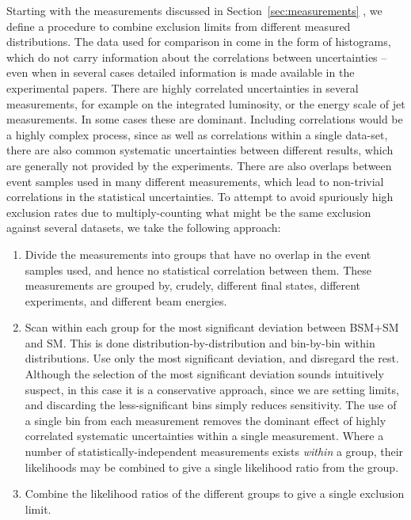 \documentclass[floatfix]{article}
\begin{document}
Starting with the measurements discussed in Section~\ref{sec:measurements} , 
we define a procedure to combine exclusion limits from different measured distributions.
The data used for comparison in \rivet come in the form of histograms, which do not carry information about the correlations between uncertainties -- 
even when in several cases detailed information is made available in the experimental papers. There are highly correlated uncertainties in several measurements, 
for example on the integrated luminosity, or the energy scale of jet measurements. In some cases these are dominant. Including correlations would be a highly 
complex process, since as well as correlations within a single data-set, there are also common systematic uncertainties between different
results, which are generally not provided by the experiments. There are also overlaps between event samples used in many different measurements, which lead to
non-trivial correlations in the statistical uncertainties. To attempt to avoid spuriously high exclusion rates due to multiply-counting what might be the 
same exclusion against several datasets, we take the following approach:
\begin{enumerate}
\item Divide the measurements into groups that have no overlap in the event samples used, and hence no statistical correlation 
between them. These measurements are grouped by, crudely, different final states, different experiments, and different beam 
energies.
\item Scan within each group for the most significant deviation between BSM+SM and SM. This is done distribution-by-distribution and bin-by-bin within distributions.
Use only the most significant deviation, and disregard the rest. Although the selection of the most significant deviation sounds intuitively suspect, in this case it
is a conservative approach, since we are setting limits, and discarding the less-significant bins simply reduces sensitivity. 
The use of a single bin from each measurement removes the dominant effect of highly correlated 
systematic uncertainties within a single measurement. Where a number
of statistically-independent measurements exists {\it within} a group, their likelihoods may be combined to give a single likelihood ratio from the group.
\item Combine the likelihood ratios of the different groups to give a single exclusion limit.
\end{enumerate}
\end{document}
